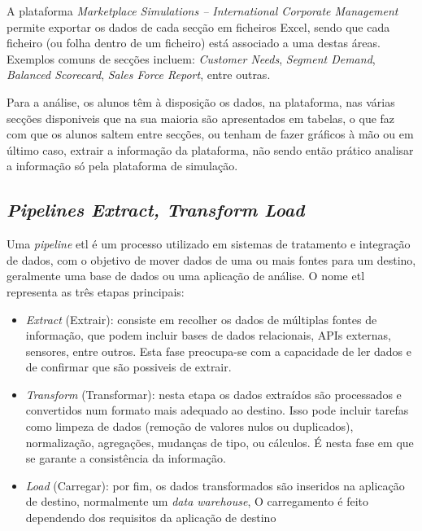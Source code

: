 A plataforma \textit{Marketplace Simulations – International Corporate Management} permite exportar os dados de cada secção em ficheiros Excel, sendo que cada ficheiro (ou folha dentro de um ficheiro) está associado a uma destas áreas. Exemplos comuns de secções incluem: \textit{Customer Needs}, \textit{Segment Demand}, \textit{Balanced Scorecard}, \textit{Sales Force Report}, entre outras.


Para a análise, os alunos têm à disposição os dados, na plataforma, nas várias secções disponiveis que na sua maioria são apresentados em tabelas, o que faz com que os alunos saltem entre secções, ou tenham de fazer gráficos à mão ou em último caso, extrair a informação da plataforma, não sendo então prático analisar a informação só pela plataforma de simulação.

\subsection{\textit{Pipelines Extract, Transform Load}}
\label{ch:etl}

Uma \textit{pipeline} \gls{etl} é um processo utilizado em sistemas de tratamento e integração de dados, com o objetivo de mover dados de uma ou mais fontes para um destino, geralmente uma base de dados ou uma aplicação de análise. O nome \gls{etl} representa as três etapas principais:

\begin{itemize}
  \item \textit{Extract} (Extrair): consiste em recolher os dados de múltiplas fontes de informação, que podem incluir bases de dados relacionais, APIs externas, sensores, entre outros. Esta fase preocupa-se com a capacidade de ler dados e de confirmar que são possiveis de extrair.
  
  \item \textit{Transform} (Transformar): nesta etapa os dados extraídos são processados e convertidos num formato mais adequado ao destino. Isso pode incluir tarefas como limpeza de dados (remoção de valores nulos ou duplicados), normalização, agregações, mudanças de tipo, ou cálculos. É nesta fase em que se garante a consistência da informação.

  \item \textit{Load} (Carregar): por fim, os dados transformados são inseridos na aplicação de destino, normalmente um \textit{data warehouse},  O carregamento é feito dependendo dos requisitos da aplicação de destino

\end{itemize}

